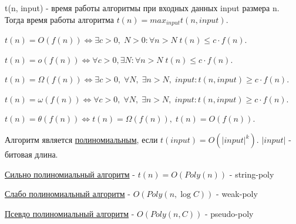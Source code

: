 \documentclass{article}
\newcommand{\tu}[1]{\underline{#1}}
\newcommand{\abs}[1]{\left|{#1}\right|}
\begin{document}
\large

t(n, input) - время работы алгоритмы при входных данных input размера n. Тогда время работы алгоритма $t(n) = max_{input} t(n, input)$. 

$t(n) = O(f(n)) \Leftrightarrow \exists c > 0, \; N > 0 : \forall n > N \; t(n) \leq c \cdot f(n)$.

$t(n) = o(f(n)) \Leftrightarrow \forall c > 0, \exists N : \forall n > N \; t(n) \leq c \cdot f(n)$.

$t(n) = \Omega(f(n)) \Leftrightarrow \exists c > 0, \; \forall N, \; \exists n > N, \; input : t(n, input) \geq c \cdot f(n) $.

$t(n) = \omega(f(n)) \Leftrightarrow \forall c > 0, \; \forall N, \; \exists n > N, \; input : t(n, input) \geq c \cdot f(n) $.

$t(n) = \theta(f(n)) \Leftrightarrow t(n) = \Omega(f(n)), \; t(n) = O(f(n))$.

Алгоритм является \tu{полиномиальным}, если $t(input) = O(\abs{input}^k)$. $\abs{input}$ - битовая длина.

\tu{Сильно полиномиальный алгоритм} - $t(n) = O(Poly(n))$ - string-poly

\tu{Слабо полиномиальный алгоритм} - $O(Poly(n, \log{C}))$ - weak-poly

\tu{Псевдо полиномиальный алгоритм} - $O(Poly(n, C))$ - pseudo-poly
\end{document}
